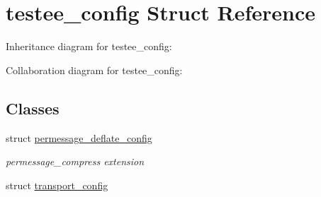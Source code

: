 \hypertarget{structtestee__config}{}\section{testee\+\_\+config Struct Reference}
\label{structtestee__config}


Inheritance diagram for testee\+\_\+config\+:


Collaboration diagram for testee\+\_\+config\+:
\subsection*{Classes}
\begin{DoxyCompactItemize}
\item 
struct \mbox{\hyperlink{structtestee__config_1_1permessage__deflate__config}{permessage\+\_\+deflate\+\_\+config}}
\begin{DoxyCompactList}\small\item\em permessage\+\_\+compress extension \end{DoxyCompactList}\item 
struct \mbox{\hyperlink{structtestee__config_1_1transport__config}{transport\+\_\+config}}
\end{DoxyCompactItemize}

